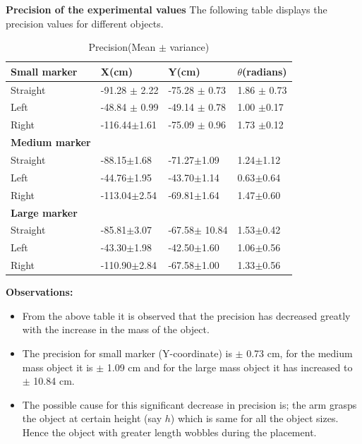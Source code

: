 \documentclass[11pt,a4paper]{article}
\begin{document}
				\textbf{Precision of the experimental values}
				The following table displays the precision values for different objects. 
				\begin{table}[h]
					\centering
					\caption{Precision(Mean $\pm$ variance)}
					\label{precision}
					\begin{tabular}{|l|l|l|l|}
						\hline
						\textbf{Small marker}   & X(cm)     & Y(cm)    & $\theta$(radians) \\ \hline
						Straight                & -91.28 $\pm$ 2.22 & -75.28 $\pm$ 0.73 & 1.86 $\pm$ 0.73  \\ \hline
						Left                    & -48.84 $\pm$ 0.99 & -49.14 $\pm$ 0.78 & 1.00 $\pm$0.17    \\ \hline
						Right                   & -116.44$\pm$1.61 & -75.09 $\pm$ 0.96 & 1.73 $\pm$0.12      \\ \hline
						\textbf{Medium marker} &        &       &  \\ \hline
						Straight                & -88.15$\pm$1.68 & -71.27$\pm$1.09  & 1.24$\pm$1.12      \\ \hline
						Left                    & -44.76$\pm$1.95  & -43.70$\pm$1.14  & 0.63$\pm$0.64      \\ \hline
						Right                   & -113.04$\pm$2.54 & -69.81$\pm$1.64  & 1.47$\pm$0.60      \\ \hline
						\textbf{Large marker}  &        &       & \\ \hline
						Straight                & -85.81$\pm$3.07  & -67.58$\pm$ 10.84  & 1.53$\pm$0.42    \\ \hline
						Left                    & -43.30$\pm$1.98  & -42.50$\pm$1.60  & 1.06$\pm$0.56    \\ \hline
						Right                   & -110.90$\pm$2.84  & -67.58$\pm$1.00  & 1.33$\pm$0.56      \\ \hline
					\end{tabular}
				\end{table}
				
				\textbf{Observations:} \begin{itemize}
					\item From the above table it is observed that the precision has decreased greatly with the increase in the mass of the object.
					\item The precision for small marker (Y-coordinate) is $\pm$ 0.73 cm, for the medium mass object it is $\pm$ 1.09 cm and for the large mass object it has increased to $\pm$ 10.84 cm.
					\item The possible cause for this significant decrease in precision is; the arm grasps the object at certain height (say $h$) which is same for all the object sizes. Hence the object with greater length wobbles during the placement. 
				\end{itemize}
				\newpage
\end{document}
